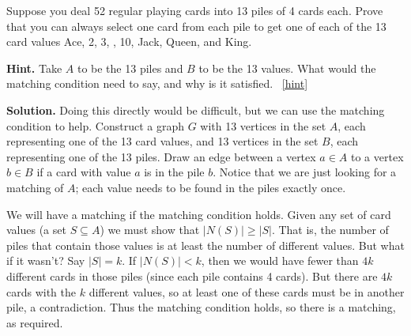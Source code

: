 \documentclass{book}
\begin{document}
\setcounter{project}{61}
\addtocounter{project}{-1}
\begin{activity}[]\label{activity-54}
\hypertarget{p-474}{}%
Suppose you deal 52 regular playing cards into 13 piles of 4 cards each. Prove that you can always select one card from each pile to get one of each of the 13 card values Ace, 2, 3, \textellipsis{}, 10, Jack, Queen, and King.%
\par\smallskip%
\noindent\textbf{Hint.}\hypertarget{hint-25}{}\quad%
\hypertarget{p-475}{}%
Take \(A\) to be the 13 piles and \(B\) to be the 13 values.  What would the matching condition need to say, and why is it satisfied.%
~\hfill{\tiny\hyperlink{a-61}{[hint]}\hypertarget{q-61}{}}\par\smallskip%
\noindent\textbf{Solution.}\hypertarget{solution-43}{}\quad%
\hypertarget{p-476}{}%
Doing this directly would be difficult, but we can use the matching condition to help. Construct a graph \(G\) with 13 vertices in the set \(A\), each representing one of the 13 card values, and 13 vertices in the set \(B\), each representing one of the 13 piles. Draw an edge between a vertex \(a \in A\) to a vertex \(b \in B\) if a card with value \(a\) is in the pile \(b\). Notice that we are just looking for a matching of \(A\); each value needs to be found in the piles exactly once.%
\par
\hypertarget{p-477}{}%
We will have a matching if the matching condition holds. Given any set of card values (a set \(S \subseteq A\)) we must show that \(|N(S)| \ge |S|\). That is, the number of piles that contain those values is at least the number of different values. But what if it wasn't? Say \(|S| = k\). If \(|N(S)| \lt  k\), then we would have fewer than \(4k\) different cards in those piles (since each pile contains 4 cards). But there are \(4k\) cards with the \(k\) different values, so at least one of these cards must be in another pile, a contradiction. Thus the matching condition holds, so there is a matching, as required.%
\end{activity}

\clearpage
\end{document}
